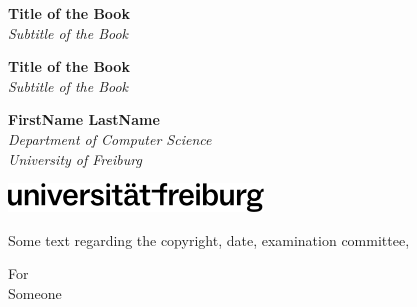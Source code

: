 \begin{titlepage}
    \pagestyle{plain}
    \vspace*{1.3in}
    \begin{center}
        {\sffamily\bfseries\LARGE Title of the Book}\\[\baselineskip]
        {\sffamily\itshape\Large Subtitle of the Book}
    \end{center}
    \vspace*{\fill}
    \cleardoublepage%
    \vspace*{0.2in}
    \begin{flushleft}
        {\sffamily\bfseries\Huge Title of the Book}\\[\baselineskip]
        {\sffamily\itshape\huge Subtitle of the Book}

        \vspace*{1in}
        {\sffamily\bfseries\Large FirstName LastName}\\[0.5\baselineskip]
        {\slshape\Large Department of Computer Science\\[0.2\baselineskip]University of Freiburg}

        \vspace*{\fill}
        \noindent\includegraphics[height=0.3in]{media/ufrlogo.pdf}
    \end{flushleft}
    \clearpage
    \vspace*{\fill}
    \begin{flushleft}
        Some text regarding the copyright, date, examination committee, \etc\
        \vspace*{0.5in}

        \blindtext
        \vspace*{0.5in}

        \blindtext
        \vspace*{0.5in}
    \end{flushleft}
    \vspace*{\fill}
    \clearpage
    \vspace*{1.6in}
    \begin{center}
        \large
        For\\[0.2in]
        Someone
    \end{center}
    \vspace*{\fill}
\end{titlepage}